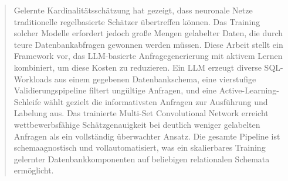 \documentclass[a4paper]{report}
\begin{document}
\cleardoublepage

\begin{abstract}
Gelernte Kardinalit\"atssch\"atzung hat gezeigt, dass neuronale Netze traditionelle regelbasierte Sch\"atzer \"ubertreffen k\"onnen. Das Training solcher Modelle erfordert jedoch gro\ss e Mengen gelabelter Daten, die durch teure Datenbankabfragen gewonnen werden m\"ussen. Diese Arbeit stellt ein Framework vor, das LLM-basierte Anfragegenerierung mit aktivem Lernen kombiniert, um diese Kosten zu reduzieren. Ein LLM erzeugt diverse SQL-Workloads aus einem gegebenen Datenbankschema, eine vierstufige Validierungspipeline filtert ung\"ultige Anfragen, und eine Active-Learning-Schleife w\"ahlt gezielt die informativsten Anfragen zur Ausf\"uhrung und Labelung aus. Das trainierte Multi-Set Convolutional Network erreicht wettbewerbsf\"ahige Sch\"atzgenauigkeit bei deutlich weniger gelabelten Anfragen als ein vollst\"andig \"uberwachter Ansatz. Die gesamte Pipeline ist schemaagnostisch und vollautomatisiert, was ein skalierbares Training gelernter Datenbankkomponenten auf beliebigen relationalen Schemata erm\"oglicht.
\end{abstract}

\tableofcontents
\thispagestyle{empty}
\listoffigures
\thispagestyle{empty}
\begingroup
\thispagestyle{empty}
\let\clearpage\relax
\vspace{3cm}
\listofalgorithms
\let\clearpage\relax
\vspace{3cm}
\listoftables
\endgroup
\thispagestyle{empty}












  
\end{document}

